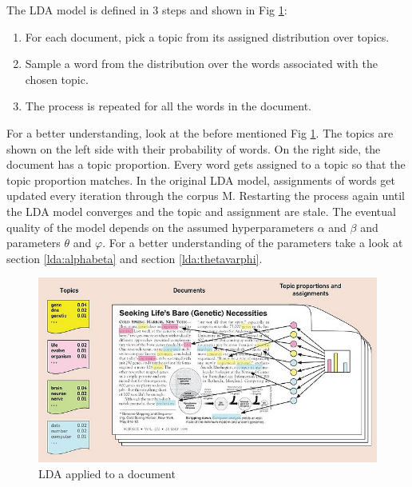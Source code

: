 The LDA model is defined in 3 steps and shown in Fig \ref{fig:LDA_example}:
\begin{enumerate}
    \item For each document, pick a topic from its assigned distribution over topics.
    \item Sample a word from the distribution over the words associated with the chosen topic. 
    \item  The process is repeated for all the words in the document.
\end{enumerate}

For a better understanding, look at the before mentioned Fig \ref{fig:LDA_example}. The topics are shown on the left side with their probability of words. On the right side, the document has a topic proportion. Every word gets assigned to a topic so that the topic proportion matches.  
In the original LDA model, assignments of words get updated every iteration through the corpus M. Restarting the process again until the LDA model converges and the topic and assignment are stale. The eventual quality of the model depends on the assumed hyperparameters $\alpha$ and $\beta$ and parameters $\theta$ and $\varphi$. For a better understanding of the parameters take a look at section \ref{lda:alphabeta} and section \ref{lda:thetavarphi}.

\begin{figure}
    \centering
    \includegraphics[scale=0.6]{methodology/700px-Illustrating_LDA.jpg}
    \caption{LDA applied to a document}
    \label{fig:LDA_example}
\end{figure}

